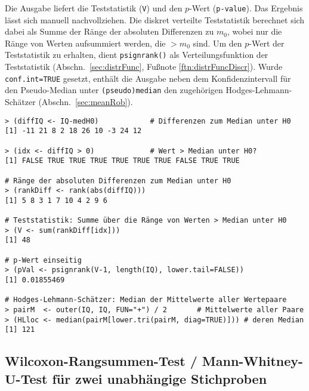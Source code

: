 Die Ausgabe liefert die Teststatistik (\lstinline!V!) und den $p$-Wert (\lstinline!p-value!). Das Ergebnis lässt sich manuell nachvollziehen. Die diskret verteilte Teststatistik berechnet sich dabei als Summe der Ränge der absoluten Differenzen zu $m_{0}$, wobei nur die Ränge von Werten aufsummiert werden, die $> m_{0}$ sind. Um den $p$-Wert der Teststatistik zu erhalten, dient \lstinline!psignrank()! als Verteilungsfunktion der Teststatistik (Abschn.\ \ref{sec:distrFunc}, Fußnote \ref{ftn:distrFuncDiscr}). Wurde \lstinline!conf.int=TRUE! gesetzt, enthält die Ausgabe neben dem Konfidenzintervall für den Pseudo-Median  unter \lstinline!(pseudo)median! den zugehörigen Hodges-Lehmann-Schätzer (Abschn.\ \ref{sec:meanRob}).
\begin{lstlisting}
> (diffIQ <- IQ-medH0)            # Differenzen zum Median unter H0
[1] -11 21 8 2 18 26 10 -3 24 12

> (idx <- diffIQ > 0)             # Wert > Median unter H0?
[1] FALSE TRUE TRUE TRUE TRUE TRUE TRUE FALSE TRUE TRUE

# Ränge der absoluten Differenzen zum Median unter H0
> (rankDiff <- rank(abs(diffIQ)))
[1] 5 8 3 1 7 10 4 2 9 6

# Teststatistik: Summe über die Ränge von Werten > Median unter H0
> (V <- sum(rankDiff[idx]))
[1] 48

# p-Wert einseitig
> (pVal <- psignrank(V-1, length(IQ), lower.tail=FALSE))
[1] 0.01855469

# Hodges-Lehmann-Schätzer: Median der Mittelwerte aller Wertepaare
> pairM  <- outer(IQ, IQ, FUN="+") / 2       # Mittelwerte aller Paare
> (HLloc <- median(pairM[lower.tri(pairM, diag=TRUE)])) # deren Median
[1] 121
\end{lstlisting}

\subsection[Wilcoxon-Rangsummen-Test / Mann-Whitney-\texorpdfstring{$U$}{U}-Test]{Wilcoxon-Rangsummen-Test / Mann-Whitney-$\bm{U}$-Test für zwei unabhängige Stichproben}
\label{sec:wilcoxRankSum}


